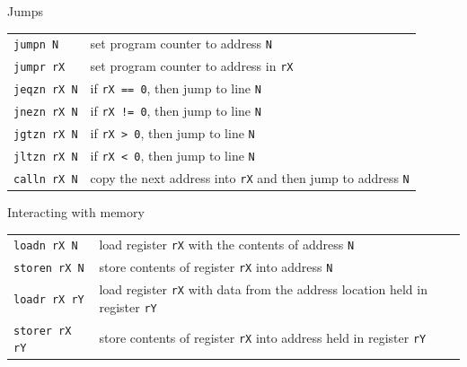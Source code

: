 \documentclass[8pt,a4paper,compress]{beamer}
\begin{document}
\begin{frame}[fragile]
\pause

Jumps

\bigskip

\begin{tabular}{ll}
\lstinline$jumpn N$ & set program counter to address \lstinline$N$ \\
\lstinline$jumpr rX$ & set program counter to address in \lstinline$rX$ \\
\lstinline$jeqzn rX N$ & if \lstinline$rX == 0$, then jump to line \lstinline$N$ \\
\lstinline$jnezn rX N$ & if \lstinline$rX != 0$, then jump to line \lstinline$N$ \\
\lstinline$jgtzn rX N$ & if \lstinline$rX > 0$, then jump to line \lstinline$N$ \\
\lstinline$jltzn rX N$ & if \lstinline$rX < 0$, then jump to line \lstinline$N$ \\
\lstinline$calln rX N$ & copy the next address into \lstinline$rX$ and then jump to address \lstinline$N$
\end{tabular} 

\pause
\bigskip

Interacting with memory

\bigskip

\begin{tabular}{ll}
\lstinline$loadn rX N$ & load register \lstinline$rX$ with the contents of address \lstinline$N$ \\
\lstinline$storen rX N$ & store contents of register \lstinline$rX$ into address \lstinline$N$ \\
\lstinline$loadr rX rY$ & load register \lstinline$rX$ with data from the address location held in register \lstinline$rY$ \\
\lstinline$storer rX rY$ & store contents of register \lstinline$rX$ into address held in register \lstinline$rY$ 
\end{tabular} 
\end{frame}
\end{document}

